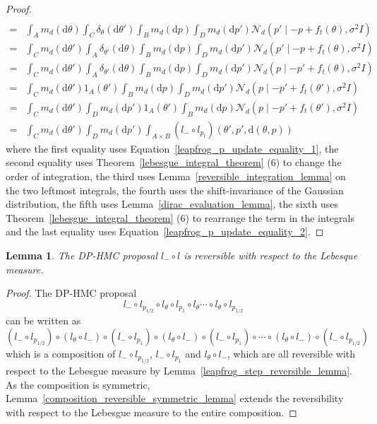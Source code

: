 \documentclass[english,twoside,openright]{HYgraduMLDS}
\newtheorem{lemma}{Lemma}[chapter]
\newcommand{\dx}{\mathrm{d}}
\newcommand{\caln}{{\mathcal{N}}}
\begin{document}
\begin{proof}
\begin{align*}
    \\=& \int_{A}m_{d}(\dx \theta)\int_{C}\delta_{\theta}(\dx \theta')\int_{B}m_{d}(\dx p)
         \int_{D}m_{d}(\dx p') \caln_{d}(p'\mid -p + f_{t}(\theta), \sigma^{2}I)
    \\=& \int_{C}m_{d}(\dx \theta')\int_{A}\delta_{\theta'}(\dx \theta)\int_{B}m_{d}(\dx p)
         \int_{D}m_{d}(\dx p') \caln_{d}(p'\mid -p + f_{t}(\theta), \sigma^{2}I)
    \\=& \int_{C}m_{d}(\dx \theta')\int_{A}\delta_{\theta'}(\dx \theta)\int_{B}m_{d}(\dx p)
         \int_{D}m_{d}(\dx p') \caln_{d}(p\mid -p' + f_{t}(\theta), \sigma^{2}I)
    \\=& \int_{C}m_{d}(\dx \theta')1_{A}(\theta')\int_{B}m_{d}(\dx p)
         \int_{D}m_{d}(\dx p') \caln_{d}(p\mid -p' + f_{t}(\theta'), \sigma^{2}I)
    \\=& \int_{C}m_{d}(\dx \theta')\int_{D}m_{d}(\dx p')1_{A}(\theta')
         \int_{B}m_{d}(\dx p)\caln_{d}(p\mid -p' + f_{t}(\theta'), \sigma^{2}I)
    \\=& \int_{C}m_{d}(\dx\theta')\int_{D}m_{d}(\dx p')
         \int_{A\times B}(l_{-}\circ l_{p_{t}})(\theta', p', \dx(\theta, p))
  \end{align*}
  where the first equality uses Equation~\ref{leapfrog_p_update_equality_1},
  the second equality uses Theorem~\ref{lebesgue_integral_theorem} (6)
  to change the order of integration,
  the third uses Lemma~\ref{reversible_integration_lemma} on the two leftmost
  integrals,
  the fourth uses the shift-invariance of the Gaussian distribution,
  the fifth uses Lemma~\ref{dirac_evaluation_lemma},
  the sixth uses Theorem~\ref{lebesgue_integral_theorem} (6) to rearrange the
  term in the integrals and the last equality uses
  Equation~\ref{leapfrog_p_update_equality_2}.
\end{proof}

\begin{lemma}\label{leapfrog_reversibility_lemma}
	The DP-HMC proposal \(l_{-} \circ l\) is reversible with respect
  to the Lebesque measure.
\end{lemma}
\begin{proof}
  The DP-HMC proposal
  \[
    l_{-}\circ l_{p_{1/2}}\circ l_{\theta}\circ l_{p_{1}}\circ l_{\theta}
    \dotsb \circ l_{\theta}\circ l_{p_{1/2}}
  \]
  can be written as
  \[
    (l_{-}\circ l_{p_{1/2}})\circ (l_{\theta} \circ l_{-})\circ (l_{-}\circ l_{p_{1}})
    \circ (l_{\theta} \circ l_{-}) \circ (l_{-} \circ l_{p_{1}})\circ
    \dotsb \circ (l_{\theta}\circ l_{-})\circ (l_{-}\circ l_{p_{1/2}})
  \]
  which is a composition of \(l_{-}\circ l_{p_{1/2}}\), \(l_{-}\circ l_{p_{1}}\)
  and \(l_{\theta}\circ l_{-}\), which are all reversible with respect to the
  Lebesgue measure by Lemma~\ref{leapfrog_step_reversible_lemma}.
  As the composition is symmetric,
  Lemma~\ref{composition_reversible_symmetric_lemma} extends the reversibility
  with respect to the Lebesgue measure to the entire composition.
\end{proof}
\end{document}

